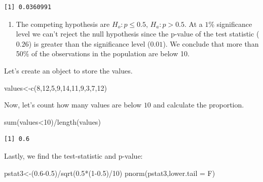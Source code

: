 \documentclass[
  letterpaper,
  DIV=11,
  numbers=noendperiod]{scrreprt}
\newenvironment{Shaded}{\begin{snugshade}}{\end{snugshade}}
\newcommand{\AttributeTok}[1]{\textcolor[rgb]{0.40,0.45,0.13}{#1}}
\newcommand{\DecValTok}[1]{\textcolor[rgb]{0.68,0.00,0.00}{#1}}
\newcommand{\FloatTok}[1]{\textcolor[rgb]{0.68,0.00,0.00}{#1}}
\newcommand{\FunctionTok}[1]{\textcolor[rgb]{0.28,0.35,0.67}{#1}}
\newcommand{\NormalTok}[1]{\textcolor[rgb]{0.00,0.23,0.31}{#1}}
\newcommand{\OtherTok}[1]{\textcolor[rgb]{0.00,0.23,0.31}{#1}}
\newcommand{\SpecialCharTok}[1]{\textcolor[rgb]{0.37,0.37,0.37}{#1}}
\providecommand{\tightlist}{%
  \setlength{\itemsep}{0pt}\setlength{\parskip}{0pt}}\usepackage{longtable,booktabs,array}
\begin{document}
\begin{verbatim}
[1] 0.0360991
\end{verbatim}

\begin{enumerate}
\def\labelenumi{\arabic{enumi}.}
\setcounter{enumi}{2}
\tightlist
\item
  The competing hypothesis are \(H_{o}: p \leq 0.5\),
  \(H_{a}: p > 0.5\). At a \(1\)\% significance level we can't reject
  the null hypothesis since the p-value of the test statistic (\(0.26\))
  is greater than the significance level (\(0.01\)). We conclude that
  more than 50\% of the observations in the population are below 10.
\end{enumerate}

Let's create an object to store the values.

\begin{Shaded}
\begin{Highlighting}[numbers=left,,]
\NormalTok{values}\OtherTok{\textless{}{-}}\FunctionTok{c}\NormalTok{(}\DecValTok{8}\NormalTok{,}\DecValTok{12}\NormalTok{,}\DecValTok{5}\NormalTok{,}\DecValTok{9}\NormalTok{,}\DecValTok{14}\NormalTok{,}\DecValTok{11}\NormalTok{,}\DecValTok{9}\NormalTok{,}\DecValTok{3}\NormalTok{,}\DecValTok{7}\NormalTok{,}\DecValTok{12}\NormalTok{)}
\end{Highlighting}
\end{Shaded}

Now, let's count how many values are below \(10\) and calculate the
proportion.

\begin{Shaded}
\begin{Highlighting}[numbers=left,,]
\FunctionTok{sum}\NormalTok{(values}\SpecialCharTok{\textless{}}\DecValTok{10}\NormalTok{)}\SpecialCharTok{/}\FunctionTok{length}\NormalTok{(values)}
\end{Highlighting}
\end{Shaded}

\begin{verbatim}
[1] 0.6
\end{verbatim}

Lastly, we find the test-statistic and p-value:

\begin{Shaded}
\begin{Highlighting}[numbers=left,,]
\NormalTok{pstat3}\OtherTok{\textless{}{-}}\NormalTok{(}\FloatTok{0.6{-}0.5}\NormalTok{)}\SpecialCharTok{/}\FunctionTok{sqrt}\NormalTok{(}\FloatTok{0.5}\SpecialCharTok{*}\NormalTok{(}\DecValTok{1}\FloatTok{{-}0.5}\NormalTok{)}\SpecialCharTok{/}\DecValTok{10}\NormalTok{)}
\FunctionTok{pnorm}\NormalTok{(pstat3,}\AttributeTok{lower.tail =}\NormalTok{ F)}
\end{Highlighting}
\end{Shaded}
\end{document}

